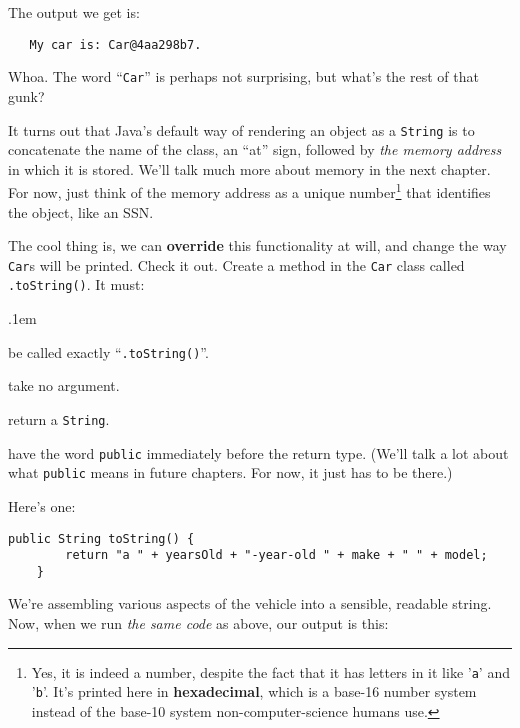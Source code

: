 The output we get is:

\begin{verbatim}
   My car is: Car@4aa298b7.
\end{verbatim}

Whoa. The word ``\texttt{Car}'' is perhaps not surprising, but what's the rest
of that gunk?

It turns out that Java's default way of rendering an object as a
\texttt{String} is to concatenate the name of the class, an ``at'' sign,
followed by \textit{the memory address} in which it is stored. We'll talk much
more about memory in the next chapter. For now, just think of the memory
address as a unique number\footnote{Yes, it is indeed a number, despite the
fact that it has letters in it like '\texttt{a}' and '\texttt{b}'. It's
printed here in \textbf{hexadecimal}, which is a base-16 number system instead
of the base-10 system non-computer-science humans use.} that identifies the
object, like an SSN.

\begin{samepage}
\label{pg:toString}
The cool thing is, we can \textbf{override} this functionality at will, and
change the way \texttt{Car}s will be printed. Check it out. Create a method in
the \texttt{Car} class called \texttt{.toString()}. It must:

\begin{compactenum}
\itemsep.1em
\item be called exactly ``\texttt{.toString()}''.
\item take no argument.
\item return a \texttt{String}.
\item have the word \texttt{public} immediately before the return type. (We'll
talk a lot about what \texttt{public} means in future chapters. For now, it just has to
be there.)
\end{compactenum}
\end{samepage}

Here's one:

\begin{Verbatim}[samepage=true,fontsize=\scriptsize,frame=single]
    public String toString() {
        return "a " + yearsOld + "-year-old " + make + " " + model;
    }
\end{Verbatim}

We're assembling various aspects of the vehicle into a sensible, readable
string. Now, when we run \textit{the same code} as above, our output is this:

